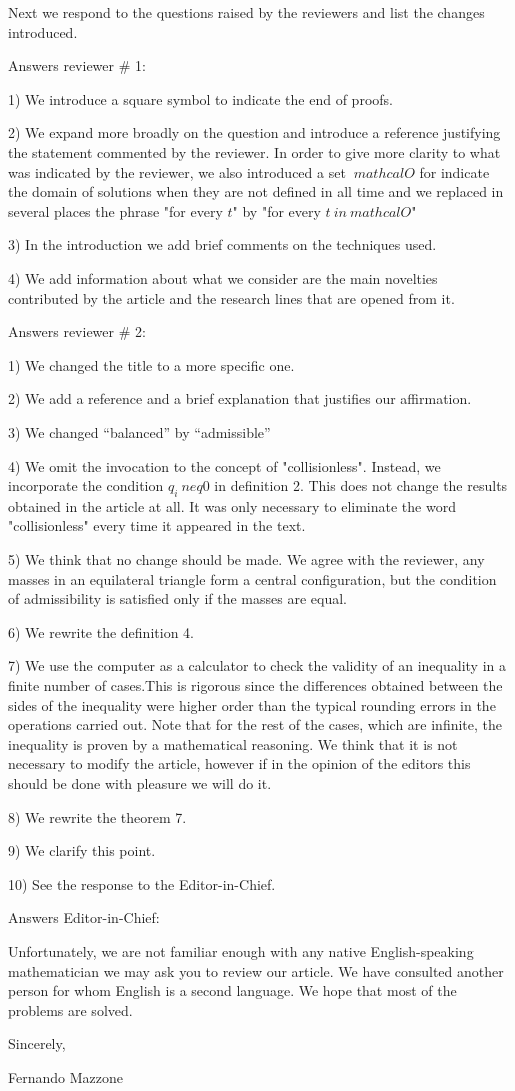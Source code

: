 \documentclass{article}
\begin{document}
Next we respond to the questions raised by the  reviewers and list the changes introduced.

Answers  reviewer # 1:

1) We introduce a square symbol to indicate the end of proofs.

2) We expand more broadly on the question and introduce a reference justifying the statement commented by the reviewer. In order to give more clarity to what was indicated by the reviewer, we also introduced a set $ \ mathcal {O} $  for indicate the domain of solutions when they are not defined in all time  and we replaced in several places the phrase "for every $ t $" by "for every $ t \ in \ mathcal {O} $"

3) In the introduction we add brief comments on the techniques used.

4) We add information about what we consider are the main novelties contributed by the article and the research lines that are opened from it.


Answers  reviewer # 2:

1) We changed the title to a more specific one.

2) We add a reference and a brief explanation that justifies our affirmation.

3) We changed ``balanced'' by ``admissible''

4) We omit the invocation to the concept of "collisionless". Instead, we incorporate the condition $q_i \ neq 0$ in definition 2. This does not change the results obtained in the article at all. It was only necessary to eliminate the word "collisionless" every time it appeared in the text.

5) We think that no change should be made. We agree with the reviewer, any masses in an equilateral triangle form a central configuration, but the condition of admissibility is satisfied only if the masses are equal.

6) We rewrite the definition 4.

7) We use the computer as a calculator to check the validity of an inequality in a finite number of cases.This is rigorous since the differences obtained between the sides of the inequality were   higher order than the typical rounding errors in the operations carried out. Note that for the rest of the cases, which are infinite, the inequality is proven by a mathematical reasoning. We think that it is not necessary to modify the article, however if in the opinion of the editors this should be done with pleasure we will do it.

8) We rewrite the theorem 7.

9) We clarify this point.

10) See the response to the Editor-in-Chief.

Answers  Editor-in-Chief:

Unfortunately, we are not familiar enough with any native English-speaking mathematician we may ask you to review our article. We have consulted another person for whom English is a second language. We hope that most of the problems are solved.

Sincerely,
\vspace{.5cm}

Fernando Mazzone
\end{document}

